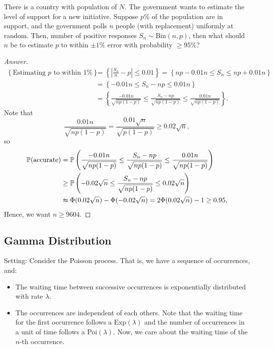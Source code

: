 \begin{eg}
    There is a country with population of \(N\). The government wants to estimate the level of support for a new initiative. Suppose \(p \%\) of the population are in support, and the government polls \(n\) people (with replacement) uniformly at random. Then, number of positive responses \(S_n \sim \mathrm{Bin}(n, p) \), then what should \(n\) be to estimate \(p\) to within \(\pm 1 \%\) error with probability \(\ge 95\%\)?      
\end{eg}

\begin{proof}[Answer]
    \begin{align*}
        \left\{ \text{Estimating } p \text{ to within } 1 \%   \right\} &= \left\{ \left\vert \frac{S_n}{n} - p \right\vert \le 0.01 \right\} = \left\{ np - 0.01n \le S_n \le np + 0.01n \right\} \\
        &= \left\{ -0.01 n \le S_n - np \le 0.01n \right\} \\
        &= \left\{ \frac{-0.01n}{\sqrt{np(1-p)} } \le \frac{S_n - np}{\sqrt{np(1 - p)} } \le \frac{0.01n}{\sqrt{np(1-p)} } \right\}.  
    \end{align*}
    Note that 
    \[
        \frac{0.01 n}{\sqrt{np(1-p)} } = \frac{0.01 \sqrt{n} }{\sqrt{p(1-p)} } \ge 0.02 \sqrt{n}, 
    \]
    so 
    \begin{align*}
        \mathbb{P} (\text{accurate} ) &= \mathbb{P} \left( \frac{-0.01n}{\sqrt{np(1-p)} } \le \frac{S_n - np}{\sqrt{np(1 - p)} } \le \frac{0.01n}{\sqrt{np(1-p)} } \right) \\ &\ge \mathbb{P} \left( -0.02 \sqrt{n} \le \frac{S_n - np}{\sqrt{np(1-p)} } \le 0.02\sqrt{n}   \right) \\
        &\thickapprox \Phi (0.02 \sqrt{n} ) - \Phi (-0.02\sqrt{n} ) = 2 \Phi (0.02\sqrt{n} ) - 1 \ge 0.95,
    \end{align*}
    Hence, we want \(n \ge 9604\). 
\end{proof}

\subsection{Gamma Distribution}
Setting: Consider the Poisson process. That is, we have a sequence of occurrences, and:
\begin{itemize}
    \item [1.] The waiting time between successive occurrences is exponentially distributed with rate \(\lambda \).
    \item [2.] The occurrences are independent of each others. Note that the waiting time for the first occurrence follows a \(\mathrm{Exp}(\lambda ) \) and the number of occurrences in a unit of time follows a \(\mathrm{Poi}(\lambda) \). Now, we care about the waiting time of the \(n\)-th occurrence.
\end{itemize}

